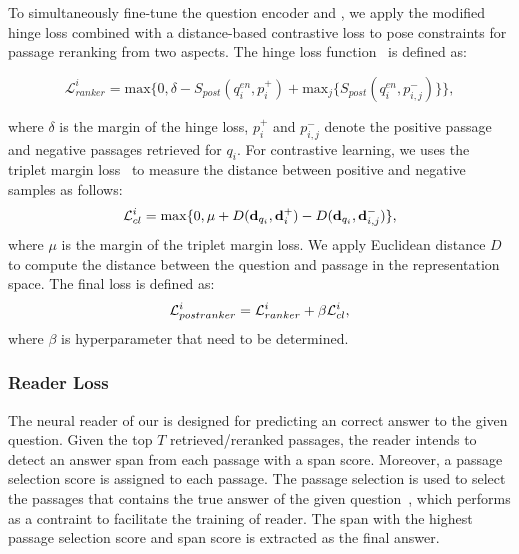 To simultaneously fine-tune the question encoder and {\rerankname}, we apply the modified hinge loss combined with a distance-based contrastive loss to pose constraints for passage reranking from two aspects. The hinge loss function~\cite{santos2016attentive} is defined as: 
\begin{small}
\begin{equation}\label{eq:rerank}
    \mathcal{L}^i_{ranker}=\mathrm{max}\{0,\delta-S_{post}(q_i^{en},p_i^+)+\mathrm{max}_j\{S_{post}(q_i^{en},p_{i,j}^-)\}\},
\end{equation}
\end{small}
where $\delta$ is the margin of the hinge loss, $p_i^+$ and $p_{i,j}^-$ denote the positive passage and negative passages retrieved for $q_i$. 
For contrastive learning, we uses the triplet margin loss~\cite{weinberger2006distance} to measure the distance between positive and negative samples as follows: 
\vspace{-0.05in}
\begin{equation}\label{eq:contrastive}
    \mathcal{L}^i_{cl}=\mathrm{max}\{0,\mu+D(\mathbf{d}_{q_i},\mathbf{d}^+_i)-D(\mathbf{d}_{q_i},\mathbf{d}_{i,j}^-)\},
    \vspace{-0.05in}
\end{equation}
where $\mu$ is the margin of the triplet margin loss. We apply Euclidean distance $D$ to compute the distance between the question and passage in the representation space. The final {\rerankname} loss is defined as:
\vspace{-0.1in}
\begin{equation}\label{eq:contrastive}
    \mathcal{L}^i_{postranker}= \mathcal{L}^i_{ranker}+\beta\mathcal{L}^i_{cl},
    \vspace{-0.05in}
\end{equation}
where $\beta$ is hyperparameter that need to be determined.

\subsubsection{Reader Loss}
The neural reader of our {\modelname} is designed for predicting an correct answer to the given question. Given the top $T$ retrieved/reranked passages, the reader intends to detect an answer span from each passage with a span score. Moreover, a passage selection score is assigned to each passage. The passage selection is used to select the passages that contains the true answer of the given question~\cite{lin2018denoising,karpukhin2020dense}, which performs as a contraint to facilitate the training of reader. The span with the highest passage selection score and span score is extracted as the final answer. 

